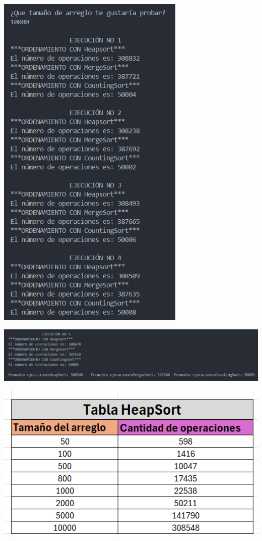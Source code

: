 \documentclass[12pt]{article}
\begin{document}
\includegraphics[width=9cm]{Images/Tam.10000/1.png}
\par\vspace{0.4cm}
\includegraphics[width=16cm]{Images/Tam.10000/2.png}
\par\vspace{0.4cm}
\includegraphics[width=15cm]{Images/Tab_HS.png}
\end{document}
